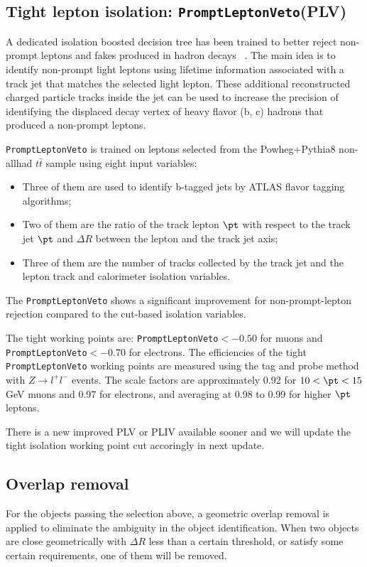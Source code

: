 \subsection{Tight lepton isolation: \texttt{PromptLeptonVeto}(PLV)}
\label{sec:Plv}
A dedicated isolation boosted decision tree has been trained to better reject non-prompt leptons and fakes produced in hadron decays ~\cite{ATL-COM-PHYS-2018-410}. The main idea is to identify non-prompt light leptons using lifetime information associated with a track jet that matches the selected light lepton. These additional reconstructed charged particle tracks inside the jet can be used to increase the precision of identifying the displaced decay vertex of heavy flavor (b, c) hadrons that produced a non-prompt leptons.

\texttt{PromptLeptonVeto} is trained on leptons selected from the Powheg+Pythia8 non-allhad $t\bar t$ sample using eight input variables:
\begin{itemize}
\item Three of them are used to identify b-tagged jets by ATLAS flavor tagging algorithms;
\item Two of them are the ratio of the track lepton $\pt$ with respect to the track jet $\pt$ and $\Delta R$ between the lepton and the track jet axis;
\item Three of them are the number of tracks collected by the track jet and the lepton track and calorimeter isolation variables. 
\end{itemize}

The \texttt{PromptLeptonVeto} shows a significant improvement for non-prompt-lepton rejection compared to the cut-based isolation variables.

The tight working points are: \texttt{PromptLeptonVeto}$<-0.50$ for muons and \texttt{PromptLeptonVeto}$<-0.70$ for electrons.  The efficiencies of the tight \texttt{PromptLeptonVeto} working points are measured using the tag and probe method with $Z\rightarrow l^+l^-$ events. The scale factors are approximately 0.92 for $10<\pt<15$ GeV muons and 0.97 for electrons, and 
averaging at 0.98 to 0.99 for higher $\pt$ leptons.

There is a new improved PLV or PLIV available sooner and we will update the tight isolation working point cut accoringly in next update.

\subsection{Overlap removal}
For the objects passing the selection above, a geometric overlap removal is applied to eliminate the ambiguity in the object identification.  When two objects are close geometrically with $\Delta R$ less than a certain threshold, or satisfy some certain requirements, one of them will be removed. 


